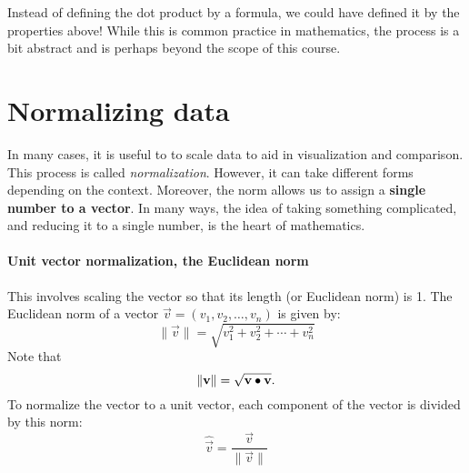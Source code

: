\documentclass{ximera}
\begin{document}
Instead of defining the dot product by a formula, we could have
defined it by the properties above!  While this is common practice in
mathematics, the process is a bit abstract and is perhaps beyond the
scope of this course.






\section{Normalizing data}

In many cases, it is useful to to scale data to aid in visualization
and comparison. This process is called
\textit{normalization}. However, it can take different forms depending
on the context. Moreover, the norm allows us to assign a
\textbf{single number to a vector}. In many ways, the idea of taking
something complicated, and reducing it to a single number, is the
heart of mathematics.



\paragraph{Unit vector normalization, the Euclidean norm}

This involves scaling the vector so that its length (or Euclidean
norm) is 1. The Euclidean norm of a vector \(\vec{v} = (v_1, v_2,
\ldots, v_n)\) is given by:
\[
\|\vec{v}\| = \sqrt{v_1^2 + v_2^2 + \cdots + v_n^2}
\]
Note that
\[
\|\mathbf{v}\| = \sqrt{\mathbf{v}\bullet\mathbf{v}}.
\]
To normalize the vector to a unit vector, each component of the vector is divided by this norm:
\[ \hat{\vec{v}} = \frac{\vec{v}}{\|\vec{v}\|} \]
\end{document}
